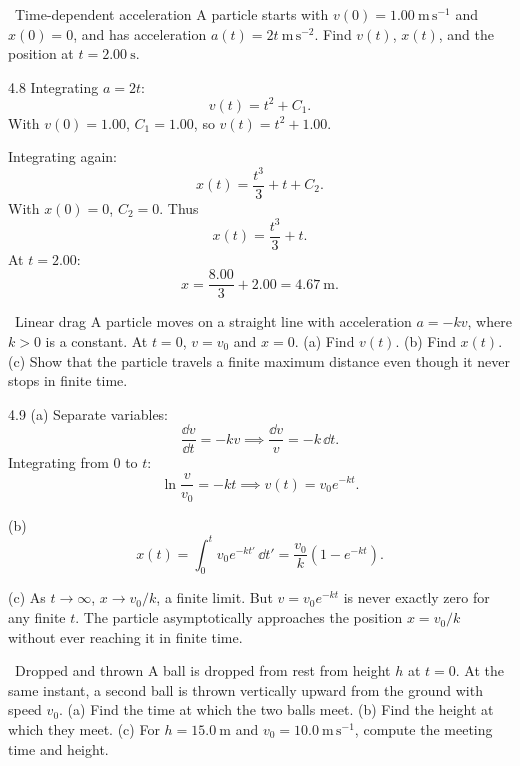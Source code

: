 \begin{exercise}{\core\ Time-dependent acceleration}
A particle starts with $v(0)=1.00\ \mathrm{m\,s^{-1}}$ and $x(0)=0$, and has
acceleration $a(t)=2t\ \mathrm{m\,s^{-2}}$. Find $v(t)$, $x(t)$, and the position
at $t=2.00\ \mathrm{s}$.
\end{exercise}

\begin{tabletworkspace}[6.5cm]
\end{tabletworkspace}

\begin{solution}{4.8}
Integrating $a=2t$:
\[
v(t)=t^2+C_1.
\]
With $v(0)=1.00$, $C_1=1.00$, so $v(t)=t^2+1.00$.

Integrating again:
\[
x(t)=\frac{t^3}{3}+t+C_2.
\]
With $x(0)=0$, $C_2=0$. Thus
\[
x(t)=\frac{t^3}{3}+t.
\]
At $t=2.00$:
\[
x=\frac{8.00}{3}+2.00=4.67\ \mathrm{m}.
\]
\end{solution}

\begin{exercise}{\mastery\ Linear drag}
A particle moves on a straight line with acceleration $a=-kv$, where $k>0$ is a
constant. At $t=0$, $v=v_0$ and $x=0$.
(a) Find $v(t)$.
(b) Find $x(t)$.
(c) Show that the particle travels a finite maximum distance even though it never
stops in finite time.
\end{exercise}

\begin{tabletworkspace}[6.5cm]
\end{tabletworkspace}

\begin{solution}{4.9}
(a) Separate variables:
\[
\frac{\dd v}{\dd t}=-kv
\implies
\frac{\dd v}{v}=-k\,\dd t.
\]
Integrating from $0$ to $t$:
\[
\ln\frac{v}{v_0}=-kt
\implies
v(t)=v_0e^{-kt}.
\]

(b)
\[
x(t)=\int_0^t v_0e^{-kt'}\,\dd t'
=\frac{v_0}{k}\left(1-e^{-kt}\right).
\]

(c) As $t\to\infty$, $x\to v_0/k$, a finite limit. But $v=v_0e^{-kt}$ is never
exactly zero for any finite $t$. The particle asymptotically approaches the
position $x=v_0/k$ without ever reaching it in finite time.
\end{solution}

\begin{exercise}{\mastery\ Dropped and thrown}
A ball is dropped from rest from height $h$ at $t=0$. At the same instant, a
second ball is thrown vertically upward from the ground with speed $v_0$.
(a) Find the time at which the two balls meet.
(b) Find the height at which they meet.
(c) For $h=15.0\ \mathrm{m}$ and $v_0=10.0\ \mathrm{m\,s^{-1}}$, compute the
meeting time and height.
\end{exercise}

